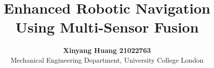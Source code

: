 \documentclass[11pt]{article}
\title{\vspace{-18pt}\fontsize{16pt}{19pt}\selectfont\textbf{Enhanced Robotic Navigation Using Multi-Sensor Fusion}}
\author{\fontsize{14pt}{17pt}\selectfont\textbf{Xinyang Huang 21022763} \\
\fontsize{12pt}{14pt}\selectfont Mechanical Engineering Department, University College London}
\date{} %
\begin{document}
\maketitle




\setlength{\columnsep}{1.27cm}
\begin{multicols}{2}












\printbibliography
\end{multicols}
\end{document}
